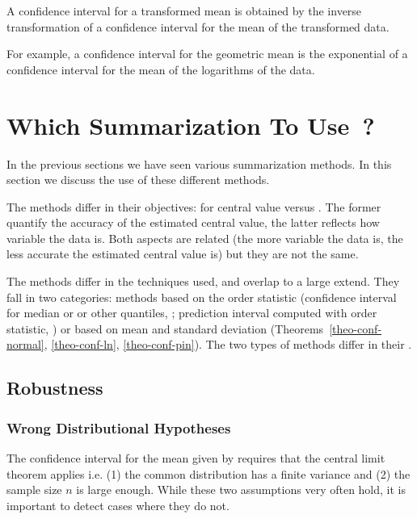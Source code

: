 \begin{shadethm}
A confidence interval for a transformed mean is obtained by the
inverse transformation of a confidence interval for the mean of
the transformed data.\label{theo-harmos}
\end{shadethm}
For example, a confidence interval for the geometric mean is
the exponential of a confidence interval for the mean of the
logarithms of the data.

\section{Which Summarization To Use~?}

In the previous sections we have seen various summarization
methods. In this section we discuss the use of these different
methods.

The methods differ in their objectives:  for central value versus .
The former quantify the accuracy of the estimated central
value, the latter reflects how variable the data is. Both
aspects are related (the more variable the data is, the less
accurate the estimated central value is) but they are not the
same.

The methods differ in the techniques used, and
overlap to a large extend. They fall in two
categories: methods based on the order statistic
(confidence interval for median or or other
quantiles, ;
prediction interval computed with order
statistic,  ) or based on
mean and standard deviation
(Theorems~\ref{theo-conf-normal},
\ref{theo-conf-ln}, \ref{theo-conf-pin}). The two
types of methods differ in their .

\subsection{Robustness}

\subsubsection{Wrong Distributional Hypotheses}
\label{sec-verify-asymptotic}
The confidence interval for the mean given by
 requires that the central
limit theorem applies  i.e. (1) the common
distribution has a finite variance and (2) the
sample size $n$ is large enough. While these two
assumptions very often hold, it is important to
detect cases where they do not.

